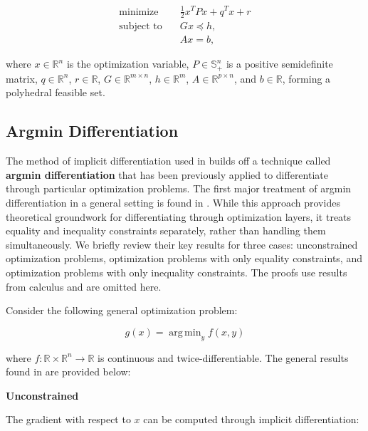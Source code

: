 \documentclass{article}
\DeclareMathOperator*{\argmin}{arg\,min}
\begin{document}
\begin{equation}
\begin{aligned}
    \text{minimize} \quad & \frac{1}{2} x^T P x + q^T x + r \\
    \text{subject to} \quad & Gx \preceq h, \\
                             & Ax = b,
\end{aligned}
\end{equation}

where \(x \in \mathbb{R}^n\) is the optimization variable, \(P \in \mathbb{S}_+^n\) is a positive semidefinite matrix, \(q \in \mathbb{R}^n\), \(r \in \mathbb{R}\), \(G \in \mathbb{R}^{m \times n}\), \(h \in \mathbb{R}^m\), \(A \in \mathbb{R}^{p \times n}\), and \(b \in \mathbb{R}\), forming a polyhedral feasible set. 

\subsection{Argmin Differentiation}

The method of implicit differentiation used in \citet{optnet} builds off a technique called \textbf{argmin differentiation} that has been previously applied to differentiate through particular optimization problems. The first major treatment of argmin differentiation in a general setting is found in \citet{gould2016differentiating}. While this approach provides theoretical groundwork for differentiating through optimization layers, it treats equality and inequality constraints separately, rather than handling them simultaneously. We briefly review their key results for three cases: unconstrained optimization problems, optimization problems with only equality constraints, and optimization problems with only inequality constraints. The proofs use results from calculus and are omitted here. 

Consider the following general optimization problem: 

\begin{equation}
g(x) = \argmin_{y} f(x,y)
\end{equation}

where $f: \mathbb{R} \times \mathbb{R}^n \rightarrow \mathbb{R}$ is continuous and twice-differentiable. The general results found in \citet{gould2016differentiating} are provided below:

\textbf{Unconstrained} 

The gradient with respect to $x$ can be computed through implicit differentiation:
\end{document}
